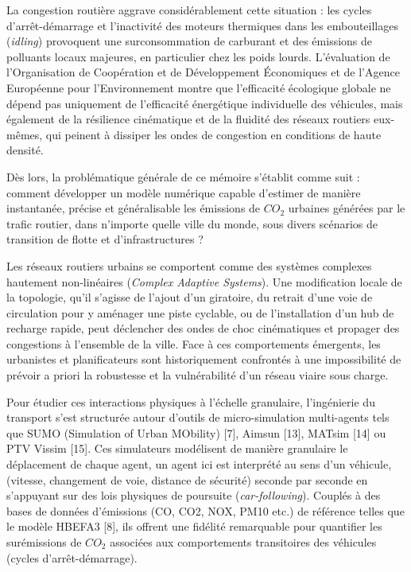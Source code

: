 \documentclass[10pt, a4paper]{article}
\begin{document}
La congestion routière aggrave considérablement cette situation : les
cycles d'arrêt-démarrage et l'inactivité des moteurs thermiques dans les
embouteillages (\emph{idling}) provoquent une surconsommation de
carburant et des émissions de polluants locaux majeures, en particulier
chez les poids lourds. L'évaluation de l'Organisation de Coopération et
de Développement Économiques et de l'Agence Européenne pour
l'Environnement montre que l'efficacité écologique globale ne dépend pas
uniquement de l'efficacité énergétique individuelle des véhicules, mais
également de la résilience cinématique et de la fluidité des réseaux
routiers eux-mêmes, qui peinent à dissiper les ondes de congestion en
conditions de haute densité.

Dès lors, la problématique générale de ce mémoire s'établit comme suit :
comment développer un modèle numérique capable d'estimer de manière
instantanée, précise et généralisable les émissions de \(CO_2\) urbaines
générées par le trafic routier, dans n'importe quelle ville du monde,
sous divers scénarios de transition de flotte et d'infrastructures ?

Les réseaux routiers urbains se comportent comme des systèmes complexes
hautement non-linéaires (\emph{Complex Adaptive Systems}). Une
modification locale de la topologie, qu'il s'agisse de l'ajout d'un
giratoire, du retrait d'une voie de circulation pour y aménager une
piste cyclable, ou de l'installation d'un hub de recharge rapide, peut
déclencher des ondes de choc cinématiques et propager des congestions à
l'ensemble de la ville. Face à ces comportements émergents, les
urbanistes et planificateurs sont historiquement confrontés à une
impossibilité de prévoir a priori la robustesse et la vulnérabilité d'un
réseau viaire sous charge.

Pour étudier ces interactions physiques à l'échelle granulaire,
l'ingénierie du transport s'est structurée autour d'outils de
micro-simulation multi-agents tels que SUMO (Simulation of Urban
MObility) {[}7{]}, Aimsun {[}13{]}, MATsim {[}14{]} ou PTV Vissim
{[}15{]}. Ces simulateurs modélisent de manière granulaire le
déplacement de chaque agent, un agent ici est interprété au sens d'un
véhicule, (vitesse, changement de voie, distance de sécurité) seconde
par seconde en s'appuyant sur des lois physiques de poursuite
(\emph{car-following}). Couplés à des bases de données d'émissions (CO,
CO2, NOX, PM10 etc.) de référence telles que le modèle HBEFA3 {[}8{]},
ils offrent une fidélité remarquable pour quantifier les surémissions de
\(CO_2\) associées aux comportements transitoires des véhicules (cycles
d'arrêt-démarrage).
\end{document}
